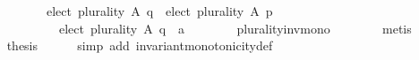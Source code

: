 \begin{isabellebody}
\ \ \ \ \ \ \ \ \ \ {\isacharparenleft}{\kern0pt}elect\ plurality\ A\ q\ {\isacharequal}{\kern0pt}\ elect\ plurality\ A\ p\ {\isasymor}\isanewline
\ \ \ \ \ \ \ \ \ \ \ \ elect\ plurality\ A\ q\ {\isacharequal}{\kern0pt}\ {\isacharbraceleft}{\kern0pt}a{\isacharbraceright}{\kern0pt}{\isacharparenright}{\kern0pt}{\isachardoublequoteclose}\isanewline
\ \ \ \ \ \ \isamarkupfalse%
\ plurality{\isacharunderscore}{\kern0pt}inv{\isacharunderscore}{\kern0pt}mono{}\isanewline
\ \ \ \ \ \ \isamarkupfalse%
\ metis\isanewline
\ \ \isamarkupfalse%
\isanewline
\ \ \isamarkupfalse%
\ {\isacharquery}{\kern0pt}thesis\isanewline
\ \ \ \ \isamarkupfalse%
\ {\isacharparenleft}{\kern0pt}simp\ add{\isacharcolon}{\kern0pt}\ invariant{\isacharunderscore}{\kern0pt}monotonicity{\isacharunderscore}{\kern0pt}def{\isacharparenright}{\kern0pt}\isanewline
{}\isamarkupfalse%
%
\endisatagproof
{\isafoldproof}%
%
\isadelimproof
\isanewline
%
\endisadelimproof
%
\isadelimtheory
\isanewline
%
\endisadelimtheory
%
\isatagtheory
{}\isamarkupfalse%
%
\endisatagtheory
{\isafoldtheory}%
%
\isadelimtheory
%
\endisadelimtheory
%
\end{isabellebody}%
\endinput
